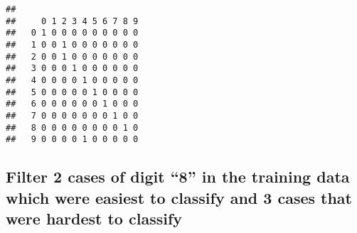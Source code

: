 \documentclass[
]{article}
\newenvironment{Shaded}{\begin{snugshade}}{\end{snugshade}}
\newcommand{\CommentTok}[1]{\textcolor[rgb]{0.56,0.35,0.01}{\textit{#1}}}
\newcommand{\ConstantTok}[1]{\textcolor[rgb]{0.56,0.35,0.01}{#1}}
\newcommand{\DecValTok}[1]{\textcolor[rgb]{0.00,0.00,0.81}{#1}}
\newcommand{\FunctionTok}[1]{\textcolor[rgb]{0.13,0.29,0.53}{\textbf{#1}}}
\newcommand{\NormalTok}[1]{#1}
\newcommand{\OtherTok}[1]{\textcolor[rgb]{0.56,0.35,0.01}{#1}}
\newcommand{\SpecialCharTok}[1]{\textcolor[rgb]{0.81,0.36,0.00}{\textbf{#1}}}
\begin{document}
\begin{verbatim}
##    
##     0 1 2 3 4 5 6 7 8 9
##   0 1 0 0 0 0 0 0 0 0 0
##   1 0 0 1 0 0 0 0 0 0 0
##   2 0 0 1 0 0 0 0 0 0 0
##   3 0 0 0 1 0 0 0 0 0 0
##   4 0 0 0 0 1 0 0 0 0 0
##   5 0 0 0 0 0 1 0 0 0 0
##   6 0 0 0 0 0 0 1 0 0 0
##   7 0 0 0 0 0 0 0 1 0 0
##   8 0 0 0 0 0 0 0 0 1 0
##   9 0 0 0 0 1 0 0 0 0 0
\end{verbatim}

\subsection{Filter 2 cases of digit ``8'' in the training data which
were easiest to classify and 3 cases that were hardest to
classify}\label{filter-2-cases-of-digit-8-in-the-training-data-which-were-easiest-to-classify-and-3-cases-that-were-hardest-to-classify}

\begin{Shaded}
\end{Shaded}
\end{document}
